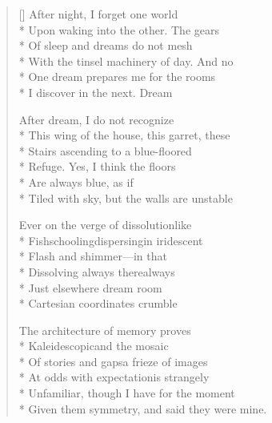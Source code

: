 \begin{verse}[\versewidth]
After night, I forget one world\\*
Upon waking into the other. The gears\\*
Of sleep and dreams do not mesh\\*
With the tinsel machinery of day.  And no\\*
One dream prepares me for the rooms\\*
I discover in the next. Dream

After dream, I do not recognize\\*
This wing of the house, this garret, these\\*
Stairs ascending to a blue-floored\\*
Refuge.  Yes, I think the floors\\*
Are always blue, as if\\*
Tiled with sky, but the walls are unstable

Ever on the verge of dissolution\qquad like\\*
Fish\quad schooling\quad dispersing\quad in iridescent\\*
Flash and shimmer---in that\\*
Dissolving always there\qquad always\\*
Just elsewhere dream room\\*
Cartesian coordinates crumble

The architecture of memory proves\\*
Kaleidescopic\qquad and the mosaic\\*
Of stories and gaps\qquad a frieze of images\\*
At odds with expectation\qquad is strangely\\*
Unfamiliar, though I have for the moment\\*
Given them symmetry, and said they were mine.
\end{verse}

